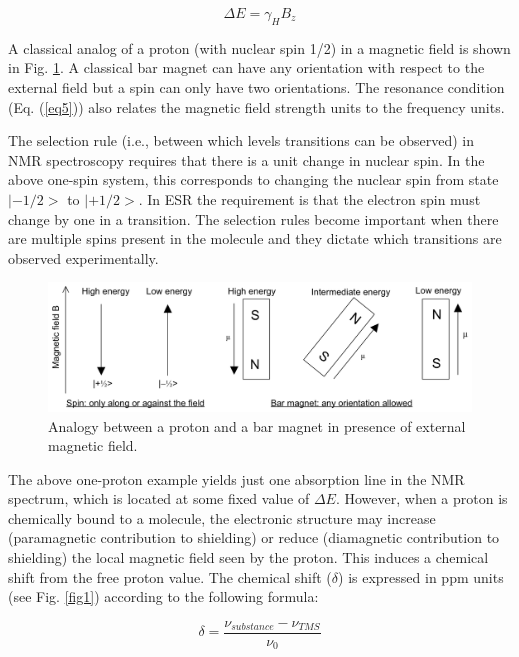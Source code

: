 \documentclass[byrevtex,amssymb,aps,pra,floatfix,letterpaper]{revtex4}
\begin{document}
\begin{equation}
\Delta E = \gamma_H B_z
\label{eq5}
\end{equation}

\noindent
A classical analog of a proton (with nuclear spin 1/2) in a magnetic field is shown in Fig. \ref{fig3}. A classical bar magnet can have any orientation with respect to the external field but a spin can only have two orientations. The resonance condition (Eq. (\ref{eq5})) also relates the magnetic field strength units to the frequency units.

The selection rule (i.e., between which levels transitions can be observed) in NMR spectroscopy requires that there is a unit change in nuclear spin. In the above one-spin system, this corresponds to changing the nuclear spin from state $|-1/2>$ to $|+1/2>$. In ESR the requirement is that the electron spin must change by one in a transition. The selection rules become important when there are multiple spins present in the molecule and they dictate which transitions are observed experimentally.

\begin{figure}[!htp]
\begin{center}
\includegraphics[scale=0.6]{fig3}
\caption{Analogy between a proton and a bar magnet in presence of external magnetic field.}
\label{fig3}
\end{center}
\end{figure}

The above one-proton example yields just one absorption line in the NMR spectrum, which is located at some fixed value of $\Delta E$. However, when a proton is
chemically bound to a molecule, the electronic structure may increase (paramagnetic contribution to shielding) or reduce (diamagnetic contribution to shielding) the local magnetic field seen by the proton. This induces a chemical shift from the free proton value. The chemical shift ($\delta$) is expressed in ppm units (see Fig. \ref{fig1}) according to the following formula:

\begin{equation}
\delta = \frac{\nu_{substance} - \nu_{TMS}}{\nu_0}
\label{eq6}
\end{equation}
\end{document}
